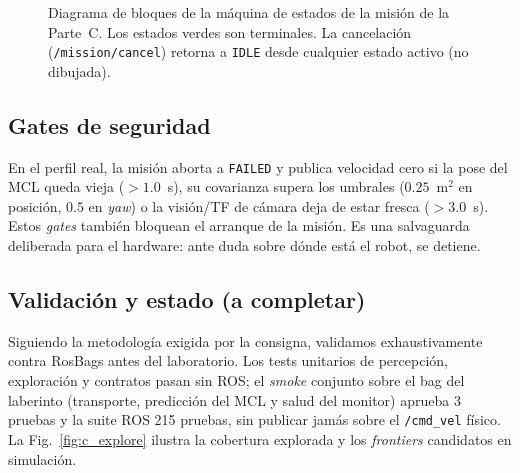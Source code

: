 \begin{figure}[t]
\centering
{}
\caption{Diagrama de bloques de la máquina de estados de la misión de la Parte~C. Los estados verdes son terminales. La cancelación (\texttt{/mission/cancel}) retorna a \texttt{IDLE} desde cualquier estado activo (no dibujada).}
\label{fig:fsm_c}
\end{figure}

\subsection{Gates de seguridad}
En el perfil real, la misión aborta a \texttt{FAILED} y publica velocidad cero si la pose del MCL queda vieja ($>1.0$~s), su covarianza supera los umbrales ($0.25$~m$^2$ en posición, $0.5$ en \emph{yaw}) o la visión/TF de cámara deja de estar fresca ($>3.0$~s). Estos \emph{gates} también bloquean el arranque de la misión. Es una salvaguarda deliberada para el hardware: ante duda sobre dónde está el robot, se detiene.

\subsection{Validación y estado (a completar)}
Siguiendo la metodología exigida por la consigna, validamos exhaustivamente contra RosBags antes del laboratorio. Los tests unitarios de percepción, exploración y contratos pasan sin ROS; el \emph{smoke} conjunto sobre el bag del laberinto (transporte, predicción del MCL y salud del monitor) aprueba 3 pruebas y la suite ROS 215 pruebas, sin publicar jamás sobre el \texttt{/cmd\_vel} físico. La Fig.~\ref{fig:c_explore} ilustra la cobertura explorada y los \emph{frontiers} candidatos en simulación.

